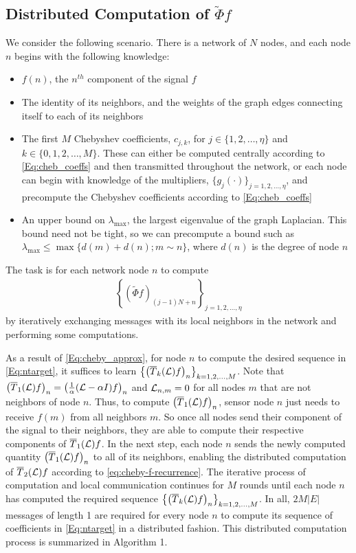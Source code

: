 \documentclass[conference]{IEEEtran}
\newcommand{\card}[1]{\lvert#1\rvert}
\renewcommand{\L}{{\mathcal{L}}}
\def\L{{\cal L}}
\begin{document}
\subsection{Distributed Computation of $\tilde{\Phi}f$} \label{Se:forward}
We consider the following scenario. There is a network of $N$ nodes, and each node $n$ begins with the following knowledge:
\begin{itemize}
\item $f(n)$, the $n^{th}$ component of the signal $f$
\item The identity of its neighbors, and the weights of the graph edges connecting itself to each of its neighbors
\item The first $M$ Chebyshev coefficients, $c_{j,k}$, for $j \in \{1,2,\ldots,\eta\}$ and $k \in \{0,1,2,\ldots,M\}$. These can either be computed centrally according to \eqref{Eq:cheb_coeffs} and then transmitted throughout the network, or each node can begin with knowledge of the
multipliers, $\{g_j(\cdot)\}_{j=1,2,\ldots,\eta}$, and precompute the Chebyshev coefficients according to \eqref{Eq:cheb_coeffs}
\item An upper bound on $\lambda_{\max}$, the largest eigenvalue of the graph Laplacian. This bound need not be tight, so we can precompute a bound such as $\lambda_{\max}\leq \max\{d(m)+d(n); m \sim n \}$, where $d(n)$ is the degree of node $n$ \cite{anderson_morley} \end{itemize}


The task is for each network node $n$ to compute
\begin{eqnarray}\label{Eq:ntarget}
\left\{\left(\tilde{\Phi} f\right)_{(j-1)N+n}\right\}_{j=1,2,\ldots,\eta}
\end{eqnarray}
by iteratively exchanging messages with its local neighbors in the network and performing some computations.

As a result of \eqref{Eq:cheby_approx}, for node $n$ to compute the desired sequence in \eqref{Eq:ntarget}, it suffices to learn $\left\{\left(\overline{T}_k(\L)f\right)_n\right\}_{k=1,2,\ldots, M}$. Note that $\left(\overline{T}_1({\L})f\right)_n=\left(\frac{1}{\alpha}({\L}-{\alpha}I)f\right)_n$ and $\L_{n,m}=0$ for all nodes $m$ that are not neighbors of node $n$. Thus, to compute $\left(\overline{T}_1({\L})f\right)_n$, sensor node $n$ just needs to receive $f(m)$ from all neighbors $m$. So once all nodes send their component of the signal to their neighbors, they are able to compute their respective components of $\overline{T}_1({\L})f$. In the next step, each node $n$ sends the newly computed quantity $\left(\overline{T}_1({\L})f\right)_n$ to all of its neighbors, enabling the distributed computation of $\overline{T}_2({\L})f$ according to \eqref{eq:cheby-f-recurrence}. The iterative process of computation and local communication continues for $M$ rounds until each node $n$ has computed the required sequence $\left\{\left(\overline{T}_k(\L)f\right)_n\right\}_{k=1,2,\ldots, M}$. In all,
$2M\card{{E}}$ messages of length 1 are required for every node $n$ to compute its sequence of coefficients in \eqref{Eq:ntarget} in a distributed fashion. This distributed computation process is summarized in Algorithm 1. 
\end{document}
